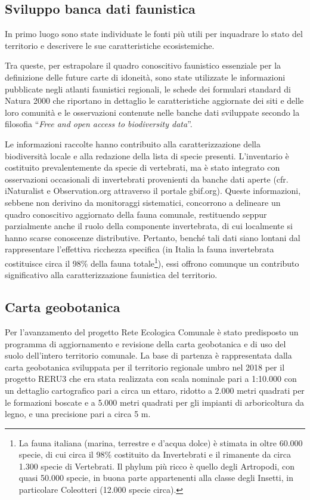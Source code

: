 \documentclass[
]{book}
\begin{document}
\subsection{Sviluppo banca dati faunistica}\label{sviluppo-banca-dati-faunistica}

In primo luogo sono state individuate le fonti più utili per inquadrare lo stato del territorio e descrivere le sue caratteristiche ecosistemiche.

Tra queste, per estrapolare il quadro conoscitivo faunistico essenziale per la definizione delle future carte di idoneità, sono state utilizzate le informazioni pubblicate negli atlanti faunistici regionali, le schede dei formulari standard di Natura 2000 che riportano in dettaglio le caratteristiche aggiornate dei siti e delle loro comunità e le osservazioni contenute nelle banche dati sviluppate secondo la filosofia ``\emph{Free and open access to biodiversity data}''.

Le informazioni raccolte hanno contribuito alla caratterizzazione della biodiversità locale e alla redazione della lista di specie presenti.
L'inventario è costituito prevalentemente da specie di vertebrati, ma è stato integrato con osservazioni occasionali di invertebrati provenienti da banche dati aperte (cfr. iNaturalist e Observation.org attraverso il portale gbif.org).
Queste informazioni, sebbene non derivino da monitoraggi sistematici, concorrono a delineare un quadro conoscitivo aggiornato della fauna comunale, restituendo seppur parzialmente anche il ruolo della componente invertebrata, di cui localmente si hanno scarse conoscenze distributive.
Pertanto, benché tali dati siano lontani dal rappresentare l'effettiva ricchezza specifica (in Italia la fauna invertebrata costituisce circa il 98\% della fauna totale\footnote{La fauna italiana (marina, terrestre e d'acqua dolce) è stimata in oltre 60.000 specie, di cui circa il 98\% costituito da Invertebrati e il rimanente da circa 1.300 specie di Vertebrati.
  Il phylum più ricco è quello degli Artropodi, con quasi 50.000 specie, in buona parte appartenenti alla classe degli Insetti, in particolare Coleotteri (12.000 specie circa).}), essi offrono comunque un contributo significativo alla caratterizzazione faunistica del territorio.

\subsection{Carta geobotanica}\label{carta-geobotanica}

Per l'avanzamento del progetto Rete Ecologica Comunale è stato predisposto un programma di aggiornamento e revisione della carta geobotanica e di uso del suolo dell'intero territorio comunale.
La base di partenza è rappresentata dalla carta geobotanica sviluppata per il territorio regionale umbro nel 2018 per il progetto RERU3 che era stata realizzata con scala nominale pari a 1:10.000 con un dettaglio cartografico pari a circa un ettaro, ridotto a 2.000 metri quadrati per le formazioni boscate e a 5.000 metri quadrati per gli impianti di arboricoltura da legno, e una precisione pari a circa 5 m.
\end{document}
